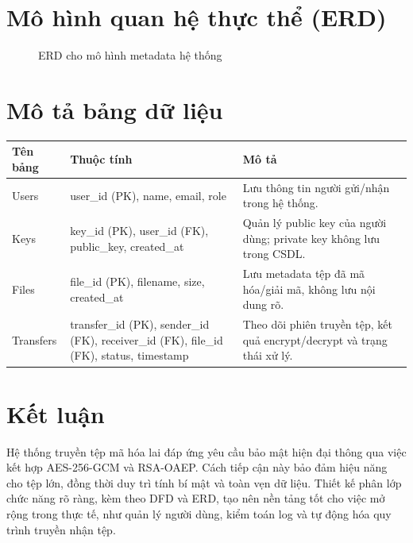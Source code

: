 \documentclass{article}
\begin{document}
\section{Mô hình quan hệ thực thể (ERD)}
\begin{figure}[H]
\centering
{}
\caption{ERD cho mô hình metadata hệ thống}
\end{figure}

\section{Mô tả bảng dữ liệu}
\begin{longtable}{|p{3cm}|p{4.2cm}|p{7cm}|}
\hline
\textbf{Tên bảng} & \textbf{Thuộc tính} & \textbf{Mô tả} \\
\hline
Users & user\_id (PK), name, email, role & Lưu thông tin người gửi/nhận trong hệ thống. \\
\hline
Keys & key\_id (PK), user\_id (FK), public\_key, created\_at & Quản lý public key của người dùng; private key không lưu trong CSDL. \\
\hline
Files & file\_id (PK), filename, size, created\_at & Lưu metadata tệp đã mã hóa/giải mã, không lưu nội dung rõ. \\
\hline
Transfers & transfer\_id (PK), sender\_id (FK), receiver\_id (FK), file\_id (FK), status, timestamp & Theo dõi phiên truyền tệp, kết quả encrypt/decrypt và trạng thái xử lý. \\
\hline
\end{longtable}

\section{Kết luận}
Hệ thống truyền tệp mã hóa lai đáp ứng yêu cầu bảo mật hiện đại thông qua việc kết hợp AES-256-GCM và RSA-OAEP. Cách tiếp cận này bảo đảm hiệu năng cho tệp lớn, đồng thời duy trì tính bí mật và toàn vẹn dữ liệu. Thiết kế phân lớp chức năng rõ ràng, kèm theo DFD và ERD, tạo nên nền tảng tốt cho việc mở rộng trong thực tế, như quản lý người dùng, kiểm toán log và tự động hóa quy trình truyền nhận tệp.
\end{document}
